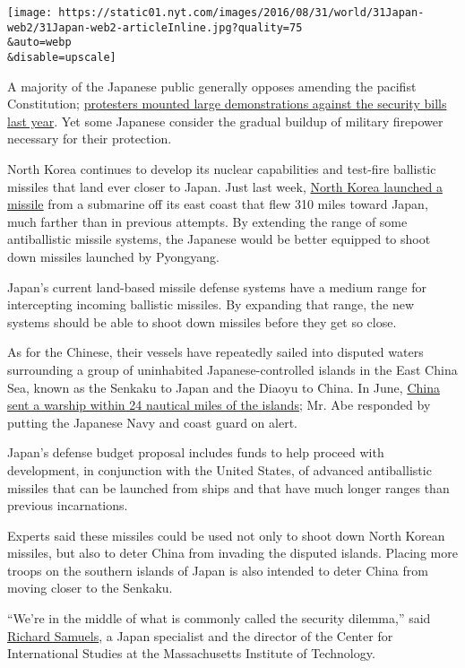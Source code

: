 \texttt{[image: https://static01.nyt.com/images/2016/08/31/world/31Japan-web2/31Japan-web2-articleInline.jpg?quality=75\\\&auto=webp\\\&disable=upscale]}

A majority of the Japanese public generally opposes amending the
pacifist Constitution;
\href{http://www.nytimes.com/2015/07/17/world/asia/japans-lower-house-passes-bills-giving-military-freer-hand-to-fight.html}{protesters
mounted large demonstrations against the security bills last year}. Yet
some Japanese consider the gradual buildup of military firepower
necessary for their protection.

North Korea continues to develop its nuclear capabilities and test-fire
ballistic missiles that land ever closer to Japan. Just last week,
\href{http://www.nytimes.com/2016/08/25/world/asia/japan-china-korea-missile-test.html}{North
Korea launched a missile} from a submarine off its east coast that flew
310 miles toward Japan, much farther than in previous attempts. By
extending the range of some antiballistic missile systems, the Japanese
would be better equipped to shoot down missiles launched by Pyongyang.

Japan's current land-based missile defense systems have a medium range
for intercepting incoming ballistic missiles. By expanding that range,
the new systems should be able to shoot down missiles before they get so
close.

As for the Chinese, their vessels have repeatedly sailed into disputed
waters surrounding a group of uninhabited Japanese-controlled islands in
the East China Sea, known as the Senkaku to Japan and the Diaoyu to
China. In June,
\href{http://www.nytimes.com/2016/06/10/world/asia/japan-china-navy-protest.html}{China
sent a warship within 24 nautical miles of the islands}; Mr. Abe
responded by putting the Japanese Navy and coast guard on alert.

Japan's defense budget proposal includes funds to help proceed with
development, in conjunction with the United States, of advanced
antiballistic missiles that can be launched from ships and that have
much longer ranges than previous incarnations.

Experts said these missiles could be used not only to shoot down North
Korean missiles, but also to deter China from invading the disputed
islands. Placing more troops on the southern islands of Japan is also
intended to deter China from moving closer to the Senkaku.

``We're in the middle of what is commonly called the security dilemma,''
said
\href{http://web.mit.edu/polisci/people/faculty/richard-samuels.html}{Richard
Samuels}, a Japan specialist and the director of the Center for
International Studies at the Massachusetts Institute of Technology.

